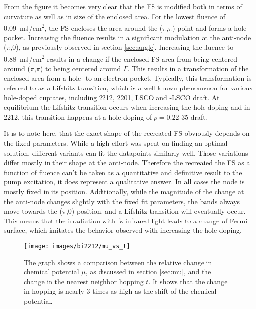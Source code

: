 From the figure it becomes very clear that the FS is modified both in terms of curvature as well as in size of the enclosed area.
For the lowest fluence of \qty{0.09}{\milli\joule/\centi\meter\squared}, the FS encloses the area around the ($\pi$,$\pi$)-point and forms a hole-pocket.
Increasing the fluence results in a significant modulation at the anti-node ($\pi$,0), as previously observed in section \ref{sec:angle}.
Increasing the fluence to  \qty{0.88}{\milli\joule/\centi\meter\squared} results in a change if the enclosed FS area from being centered around ($\pi$,$\pi$) to being centered around $\Gamma$.
This results in a transformation of the enclosed area from a hole- to an electron-pocket.
Typically, this transformation is referred to as a Lifshitz transition, which is a well known phenomenon for various hole-doped cuprates, including 2212, 2201, LSCO and -LSCO \cite{} draft.
At equilibrium the Lifshitz transition occurs when increasing the hole-doping and in 2212, this transition happens at a hole doping of $p=0.22$ \cite{} 35 draft.

It is to note here, that the exact shape of the recreated FS obviously depends on the fixed parameters.
While a high effort was spent on finding an optimal solution, different variants can fit the datapoints similarly well.
Those variations differ mostly in their shape at the anti-node.
Therefore the recreated the FS as a function of fluence can't be taken as a quantitative and definitive result to the pump excitation, it does represent a qualitative answer.
In all cases the node is mostly fixed in its position.
Additionally, while the magnitude of the change at the anti-node changes slightly with the fixed fit parameters, the bands always move towards the ($\pi$,0) position, and a Lifshitz transition will eventually occur.
This means that the irradiation with \unit{\femto\second} infrared light leads to a change of Fermi surface, which imitates the behavior observed with increasing the hole doping. 

\begin{figure}
	\centering
	\texttt{[image: images/bi2212/mu\_vs\_t]}
	\caption{The graph shows a comparison between the relative change in chemical potential $\mu$, as discussed in section \ref{sec:mu}, and the change in the nearest neighbor hopping $t$. It shows that the change in hopping is nearly 3 times as high as the shift of the chemical potential.}
	\label{fig:mu_t}
\end{figure}


